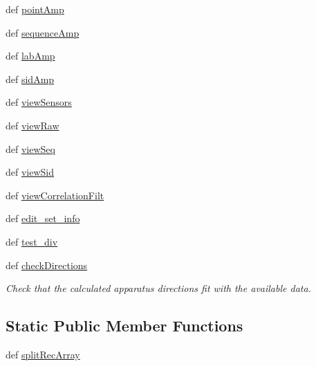 \begin{DoxyCompactItemize}
def \hyperlink{classrepo_1_1programs_1_1pythonpackages_1_1pr_1_1SPDataSet_1_1SPDataSet_a6f2c3de2aa708d686f5835f10e2d096d}{point\-Amp}
\item 
def \hyperlink{classrepo_1_1programs_1_1pythonpackages_1_1pr_1_1SPDataSet_1_1SPDataSet_accbfa0185d4e416038e688fc9b55575b}{sequence\-Amp}
\item 
def \hyperlink{classrepo_1_1programs_1_1pythonpackages_1_1pr_1_1SPDataSet_1_1SPDataSet_ac0df54b82a9e993d707f0dafd87a19dd}{lab\-Amp}
\item 
def \hyperlink{classrepo_1_1programs_1_1pythonpackages_1_1pr_1_1SPDataSet_1_1SPDataSet_acf495c99c803a2a1e23cdaeae34da985}{sid\-Amp}
\item 
def \hyperlink{classrepo_1_1programs_1_1pythonpackages_1_1pr_1_1SPDataSet_1_1SPDataSet_a0c87af10688edd55eb0aea229e5979bb}{view\-Sensors}
\item 
def \hyperlink{classrepo_1_1programs_1_1pythonpackages_1_1pr_1_1SPDataSet_1_1SPDataSet_a5343a59b34ffebfc31c1dfd06ddfa889}{view\-Raw}
\item 
def \hyperlink{classrepo_1_1programs_1_1pythonpackages_1_1pr_1_1SPDataSet_1_1SPDataSet_ac55c6ccc03634d3f670f52e89188779c}{view\-Seq}
\item 
def \hyperlink{classrepo_1_1programs_1_1pythonpackages_1_1pr_1_1SPDataSet_1_1SPDataSet_a3624263a6738178d243635889b719a90}{view\-Sid}
\item 
def \hyperlink{classrepo_1_1programs_1_1pythonpackages_1_1pr_1_1SPDataSet_1_1SPDataSet_a5aad808c592bfdbb665105df2947610f}{view\-Correlation\-Filt}
\item 
def \hyperlink{classrepo_1_1programs_1_1pythonpackages_1_1pr_1_1SPDataSet_1_1SPDataSet_a672b7a8c57a535e8c91a4c106283d3a9}{edit\-\_\-set\-\_\-info}
\item 
def \hyperlink{classrepo_1_1programs_1_1pythonpackages_1_1pr_1_1SPDataSet_1_1SPDataSet_a2ffa7a6de1e0ebd8172db800621eed20}{test\-\_\-div}
\item 
def \hyperlink{classrepo_1_1programs_1_1pythonpackages_1_1pr_1_1SPDataSet_1_1SPDataSet_a5ad35e931371981e41221502928547d5}{check\-Directions}
\begin{DoxyCompactList}\small\item\em Check that the calculated apparatus directions fit with the available data. \end{DoxyCompactList}\end{DoxyCompactItemize}
\subsection*{Static Public Member Functions}
\begin{DoxyCompactItemize}
\item 
def \hyperlink{classrepo_1_1programs_1_1pythonpackages_1_1pr_1_1SPDataSet_1_1SPDataSet_a1e4c1d502ec5ff9a57bf9a330a318a54}{split\-Rec\-Array}
\end{DoxyCompactItemize}
